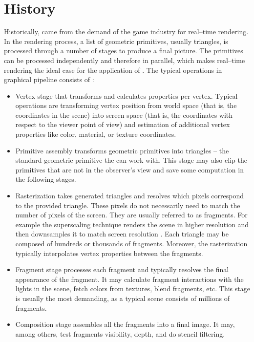 \section{History}

Historically, \gpu came from the demand of the game industry for real--time rendering. In the rendering process, a list of geometric primitives, usually triangles, is processed through a number of stages to produce a final picture. The primitives can be processed independently and therefore in parallel, which makes real--time rendering the ideal case for the application of \gpuns. The typical operations in graphical pipeline consists of \citep{GPUComputingOwens}:
\begin{itemize}
    \item Vertex stage that transforms and calculates properties per vertex. Typical operations are transforming vertex position from world space (that is, the coordinates in the scene) into screen space (that is, the coordinates with respect to the viewer point of view) and estimation of additional vertex properties like color, material, or texture coordinates.
    \item Primitive assembly transforms geometric primitives into triangles -- the standard geometric primitive the \gpu can work with. This stage may also clip the primitives that are not in the observer's view and save some computation in the following stages.
    \item Rasterization takes generated triangles and resolves which pixels correspond to the provided triangle. These pixels do not necessarily need to match the number of pixels of the screen. They are usually referred to as fragments. For example the superscaling technique renders the scene in higher resolution and then downsamples it to match screen resolution \citep{GameGraphicProgramming}. Each triangle may be composed of hundreds or thousands of fragments. Moreover, the rasterization typically interpolates vertex properties between the fragments.
    \item Fragment stage processes each fragment and typically resolves the final appearance of the fragment. It may calculate fragment interactions with the lights in the scene, fetch colors from textures, blend fragments, etc. This stage is usually the most demanding, as a typical scene consists of millions of fragments.
    \item Composition stage assembles all the fragments into a final image. It may, among others, test fragments visibility, depth, and do stencil filtering.
\end{itemize}

